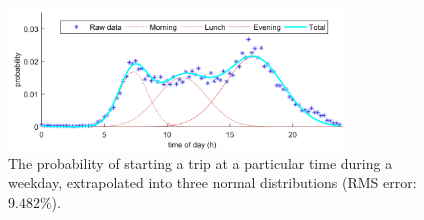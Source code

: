 \begin{figure}\centering
	\includegraphics[width=0.8\textwidth]{_chapter4/fig/starting-a-trip-probability}
	\caption{The probability of starting a trip at a particular time during a weekday, extrapolated into three normal distributions (RMS error: $9.482\%$).}
	\label{ch4:fig:starting-a-trip-probability}
\end{figure}
